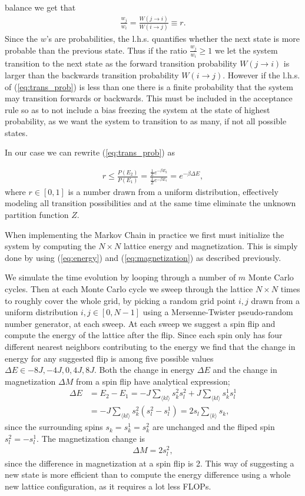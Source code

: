 \documentclass[twocolumn]{aastex62}
\begin{document}
balance we get that
\begin{align}
	\frac{w_j}{w_i} = \frac{W(j \to i)}{W(i \to j)} \equiv r.
	\label{eq:trans_prob}
\end{align}
Since the $w$'s are probabilities, the l.h.s. quantifies whether the next state
is more probable than the previous state. Thus if the ratio
$\frac{w_j}{w_i}\geq 1$ we let the system transition to the next state as the
forward transition probability $W(j \to i)$ is larger than the backwards
transition probability $W(i \to j)$. However if the l.h.s. of
(\ref{eq:trans_prob}) is less than one there is a finite probability that the
system may transition forwards or backwards. This must be included in the acceptance rule so as
to not include a bias freezing the system at the state of highest probability,
as we want the system to transition to as many, if not all possible states.

In our case we can rewrite (\ref{eq:trans_prob}) as

\begin{align}
	r \leq \frac{P(E_2)}{P(E_1)} = \frac{\frac{1}{Z}e^{-\beta E_2}}{\frac{1}{Z}e^{-\beta E_1}} = e^{-\beta\Delta E},
\end{align}
where $r\in[0, 1]$ is a number drawn from a uniform distribution, effectively
modeling all transition possibilities and at the same time eliminate the unknown
partition function $Z$.

When implementing the Markov Chain in practice we first must initialize the
system by computing the $N\times N$ lattice energy and magnetization.
This is simply done by using (\ref{eq:energy}) and (\ref{eq:magnetization}) as
described previously.

We simulate the time evolution by looping through a number of $m$ Monte Carlo
cycles. Then at each Monte Carlo cycle we sweep through the lattice $N\times N$
times to roughly cover the whole grid, by picking a random grid point $i, j$
drawn from a uniform distribution $i,j\in[0, N-1]$ using a Mersenne-Twister
pseudo-random number generator, at each sweep. At each sweep we
suggest a spin flip and compute the energy of the lattice after the flip. Since each spin only has four different nearest neighbors
contributing
to
the energy we find that the change in energy for any suggested flip is among
five possible values $\Delta E \in {-8J, -4J, 0, 4J, 8J}$. Both the change in
energy $\Delta E$ and the change in magnetization $\Delta M$ from a spin flip have analytical
expression;
\begin{align}
	\Delta E &= E_2 - E_1 = -J\sum_{\langle kl\rangle}s_k^2s_l^2 + J\sum_{\langle kl\rangle}s_k^1s_l^1 \\
	&= -J\sum_{\langle kl\rangle}s_k^2(s_l^2-s_l^1) = 2s_l\sum_{\langle k\rangle} s_k,
\end{align}
since the surrounding spins $s_k = s_k^1 = s_k^2$ are unchanged and the fliped
spin $s_l^2 = -s_l^1$. The magnetization change is
\begin{align}
	\Delta M = 2s_l^2,
\end{align}
since the difference in magnetization at a spin flip is 2. This way of
suggesting a new state is more efficient than to compute the energy difference
using a whole new lattice configuration, as it requires a lot less FLOPs.
\end{document}
